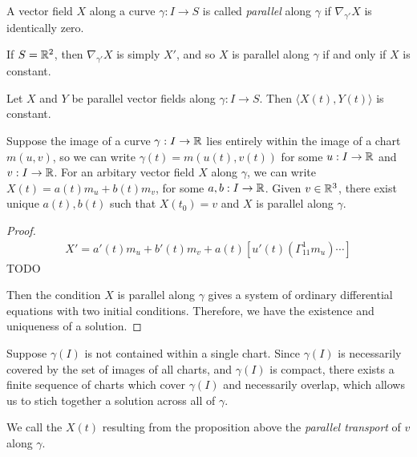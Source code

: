 \begin{defn}
    A vector field $X$ along a curve $\gamma: I \to S$ is called \emph{parallel} along $\gamma$ if $\nabla_{\gamma'}X$ is identically zero.
\end{defn}

\begin{exmp}
    If $S = \mathbb{R}^2$, then $\nabla_{\gamma'}X$ is simply $X'$, and so $X$ is parallel along $\gamma$ if and only if $X$ is constant.
\end{exmp}

\begin{prop}
    Let $X$ and $Y$ be parallel vector fields along $\gamma: I \to S$. Then $\langle X(t), Y(t)\rangle$ is constant.
\end{prop}

\begin{prop}\label{prop:parallel-vector-field-existance-uniqueness}
    Suppose the image of a curve $\gamma: I \to \mathbb{R}$ lies entirely within the image of a chart $m(u, v)$, so we can write $\gamma(t) = m(u(t), v(t))$ for some $u: I \to \mathbb{R}$ and $v: I \to \mathbb{R}$. For an arbitary vector field $X$ along $\gamma$, we can write $X(t) = a(t)m_u + b(t)m_v$, for some $a, b: I \to \mathbb{R}$. Given $v \in \mathbb{R}^3$, there exist unique $a(t), b(t)$ such that $X(t_0) = v$ and $X$ is parallel along $\gamma$.
\end{prop}

\begin{proof}
    \begin{align*}
        X' = a'(t)m_u + b'(t)m_v + a(t)\left[u'(t)\left(\Gamma_{11}^{1}m_u\right) \cdots\right]
    \end{align*}
    {\color{red}TODO}

    Then the condition $X$ is parallel along $\gamma$ gives a system of ordinary differential equations with two initial conditions. Therefore, we have the existence and uniqueness of a solution.
\end{proof}

\begin{rmk}
    Suppose $\gamma(I)$ is not contained within a single chart. Since $\gamma(I)$ is necessarily covered by the set of images of all charts, and $\gamma(I)$ is compact, there exists a finite sequence of charts which cover $\gamma(I)$ and necessarily overlap, which allows us to stich together a solution across all of $\gamma$.
\end{rmk}

\begin{defn}
    We call the $X(t)$ resulting from the proposition above the \emph{parallel transport} of $v$ along $\gamma$.
\end{defn}


